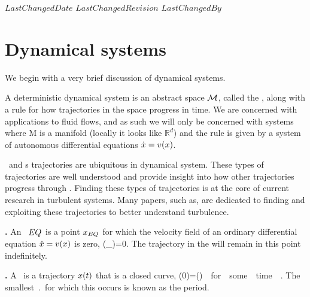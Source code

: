 
{$LastChangedDate$}
{$LastChangedRevision$} {$LastChangedBy$}

    \ifarticle
    \else

\section{Dynamical systems}

We begin with a very brief discussion of dynamical systems.

A deterministic dynamical system is an abstract space ${\cal M}$, called the {\statesp}, along with a rule for how trajectories in the space progress in time. We are concerned with applications to fluid flows, and as such we will only be concerned with systems where M is a manifold (locally it looks like $\mathbb{R}^d$) and the rule is given by a system of autonomous differential equations $\dot{x}=v(x)$.

\Eqva\ and \po s trajectories are ubiquitous in dynamical system. These types of trajectories are well understood and provide insight into how other trajectories progress through {\statesp}. Finding these types of trajectories is at the core of current research in turbulent systems. Many papers, such as, are dedicated to finding and exploiting these trajectories to better understand turbulence.

\begin{definition}
\textbf{\Eqva.}
\label{def:eqva}
An \eqv\ $EQ_{}$ is a point $x_{EQ_{}}$ for which the
velocity field of an ordinary differential equation
$\dot{x} = v(x)$ is zero,
\beq
\vel(\ssp_{\EQV{}})=0.
\eeq
The trajectory in the {\statesp} will remain in this point indefinitely.
\end{definition}


\begin{definition}
\textbf{\Po.}
\label{def:po}
A \po\ is a trajectory $x(t)$ that is a closed curve,
\beq
\ssp(0)=\ssp(\period{}) \,\, for \,\, some \,\, time \,\, \period{}.
\eeq
The smallest $\period{}$ for which this occurs is known as the period.
\end{definition}

\subsection{\CLe}
	
